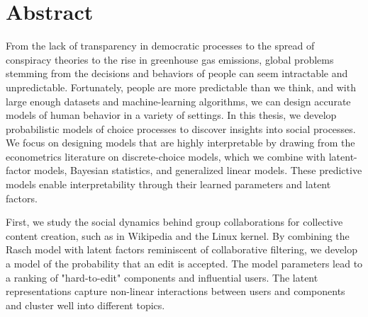 \cleardoublepage
\chapter*{Abstract}

From the lack of transparency in democratic processes to the spread of conspiracy theories to the rise in greenhouse gas emissions, global problems stemming from the decisions and behaviors of people can seem intractable and unpredictable.
Fortunately, people are more predictable than we think, and with large enough datasets and machine-learning algorithms, we can design accurate models of human behavior in a variety of settings.
In this thesis, we develop probabilistic models of choice processes to discover insights into social processes.
We focus on designing models that are highly interpretable by drawing from the econometrics literature on discrete-choice models, which we combine with latent-factor models, Bayesian statistics, and generalized linear models.
These predictive models enable interpretability through their learned parameters and latent factors.

First, we study the social dynamics behind group collaborations for collective content creation, such as in Wikipedia and the Linux kernel.
By combining the Rasch model with latent factors reminiscent of collaborative filtering, we develop a model of the probability that an edit is accepted.
The model parameters lead to a ranking of "hard-to-edit" components and influential users.
The latent representations capture non-linear interactions between users and components and cluster well into different topics.

